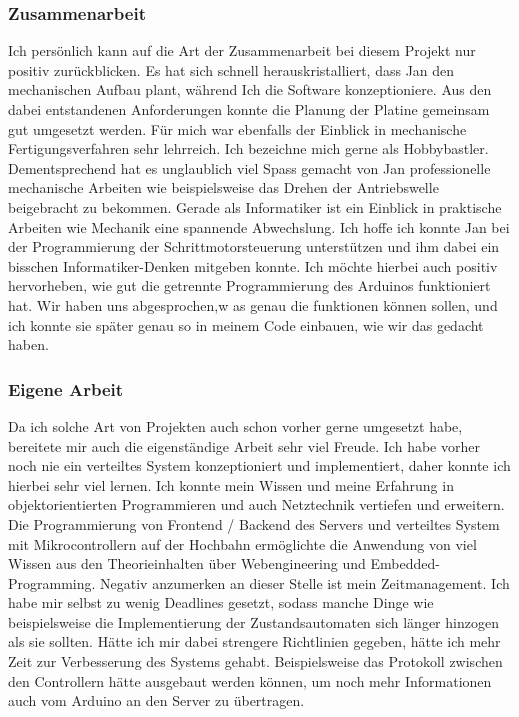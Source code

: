 \subsubsection{Zusammenarbeit}
Ich persönlich kann auf die Art der Zusammenarbeit bei diesem Projekt nur positiv zurückblicken. Es hat sich schnell herauskristalliert, dass Jan den mechanischen Aufbau plant, während Ich die Software konzeptioniere. Aus den dabei entstandenen Anforderungen konnte die Planung der Platine gemeinsam gut umgesetzt werden. Für mich war ebenfalls der Einblick in mechanische Fertigungsverfahren sehr lehrreich. Ich bezeichne mich gerne als Hobbybastler. Dementsprechend hat es unglaublich viel Spass gemacht von Jan professionelle mechanische Arbeiten wie beispielsweise das Drehen der Antriebswelle beigebracht zu bekommen. Gerade als Informatiker ist ein Einblick in praktische Arbeiten wie Mechanik eine spannende Abwechslung. Ich hoffe ich konnte Jan bei der Programmierung der Schrittmotorsteuerung unterstützen und ihm dabei ein bisschen Informatiker-Denken mitgeben konnte. Ich möchte hierbei auch positiv hervorheben, wie gut die getrennte Programmierung des Arduinos funktioniert hat. Wir haben uns abgesprochen,w as genau die funktionen können sollen, und ich konnte sie später genau so in meinem Code einbauen, wie wir das gedacht haben. 
\subsubsection{Eigene Arbeit}
Da ich solche Art von Projekten auch schon vorher gerne umgesetzt habe, bereitete mir auch die eigenständige Arbeit sehr viel Freude. Ich habe vorher noch nie ein verteiltes System konzeptioniert und implementiert, daher konnte ich hierbei sehr viel lernen. Ich konnte mein Wissen und meine Erfahrung in objektorientierten Programmieren und auch Netztechnik vertiefen und erweitern. Die Programmierung von Frontend / Backend des Servers und verteiltes System mit Mikrocontrollern auf der Hochbahn ermöglichte die Anwendung von viel Wissen aus den Theorieinhalten über Webengineering und Embedded-Programming. Negativ anzumerken an dieser Stelle ist mein Zeitmanagement. Ich habe mir selbst zu wenig Deadlines gesetzt, sodass manche Dinge wie beispielsweise die Implementierung der Zustandsautomaten sich länger hinzogen als sie sollten. Hätte ich mir dabei strengere Richtlinien gegeben, hätte ich mehr Zeit zur Verbesserung des Systems gehabt. Beispielsweise das Protokoll zwischen den Controllern hätte ausgebaut werden können, um noch mehr Informationen auch vom Arduino an den Server zu übertragen. 